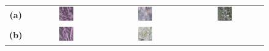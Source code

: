 \begin{figure}[h!]
    \centering
    \setlength{\tabcolsep}{2pt} %
    \renewcommand{\arraystretch}{1.0} %

    \begin{tabular}{c *{3}{c}}
        \textbf{(a)} &
        \includegraphics[width=0.2\textwidth, height=0.2\textheight, keepaspectratio]{img/qualitative-20/sample_1/sar.png} &
        \includegraphics[width=0.2\textwidth, height=0.2\textheight, keepaspectratio]{img/qualitative-20/sample_1/gen.png} &
        \includegraphics[width=0.2\textwidth, height=0.2\textheight, keepaspectratio]{img/qualitative-20/sample_1/gt.png} \\
        \textbf{(b)} &
        \includegraphics[width=0.2\textwidth, height=0.2\textheight, keepaspectratio]{img/qualitative-20/sample_3/sar.png} &
        \includegraphics[width=0.2\textwidth, height=0.2\textheight, keepaspectratio]{img/qualitative-20/sample_3/gen.png} &

\end{tabular}
\end{figure}
